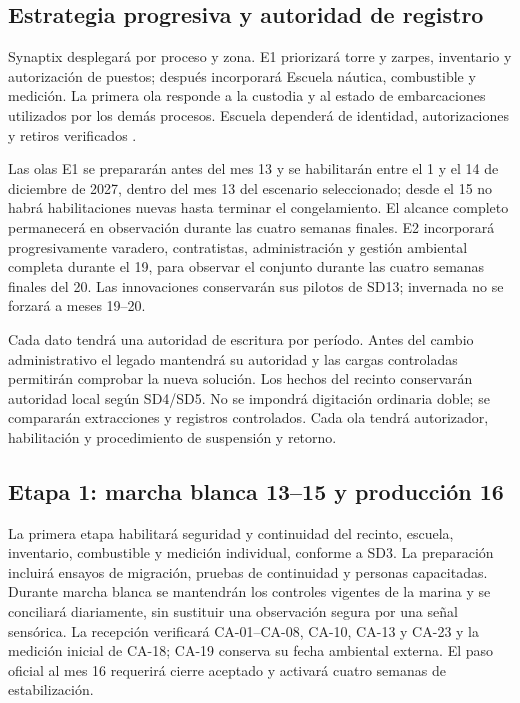 \subsection{Estrategia progresiva y autoridad de registro}
Synaptix desplegará por proceso y zona. E1 priorizará torre y zarpes, inventario y autorización de puestos; después incorporará Escuela náutica, combustible y medición. La primera ola responde a la custodia y al estado de embarcaciones utilizados por los demás procesos. Escuela dependerá de identidad, autorizaciones y retiros verificados \parencite[cap.~17, secc.~17.6, p.~43]{caso07}.

Las olas E1 se prepararán antes del mes 13 y se habilitarán entre el 1 y el 14 de diciembre de 2027, dentro del mes 13 del escenario seleccionado; desde el 15 no habrá habilitaciones nuevas hasta terminar el congelamiento. El alcance completo permanecerá en observación durante las cuatro semanas finales. E2 incorporará progresivamente varadero, contratistas, administración y gestión ambiental completa durante el 19, para observar el conjunto durante las cuatro semanas finales del 20. Las innovaciones conservarán sus pilotos de SD13; invernada no se forzará a meses 19--20.

Cada dato tendrá una autoridad de escritura por período. Antes del cambio administrativo el legado mantendrá su autoridad y las cargas controladas permitirán comprobar la nueva solución. Los hechos del recinto conservarán autoridad local según SD4/SD5. No se impondrá digitación ordinaria doble; se compararán extracciones y registros controlados. Cada ola tendrá autorizador, habilitación y procedimiento de suspensión y retorno.

\subsection{Etapa 1: marcha blanca 13--15 y producción 16}
La primera etapa habilitará seguridad y continuidad del recinto, escuela, inventario, combustible y medición individual, conforme a SD3. La preparación incluirá ensayos de migración, pruebas de continuidad y personas capacitadas. Durante marcha blanca se mantendrán los controles vigentes de la marina y se conciliará diariamente, sin sustituir una observación segura por una señal sensórica. La recepción verificará CA-01--CA-08, CA-10, CA-13 y CA-23 y la medición inicial de CA-18; CA-19 conserva su fecha ambiental externa. El paso oficial al mes 16 requerirá cierre aceptado y activará cuatro semanas de estabilización.

